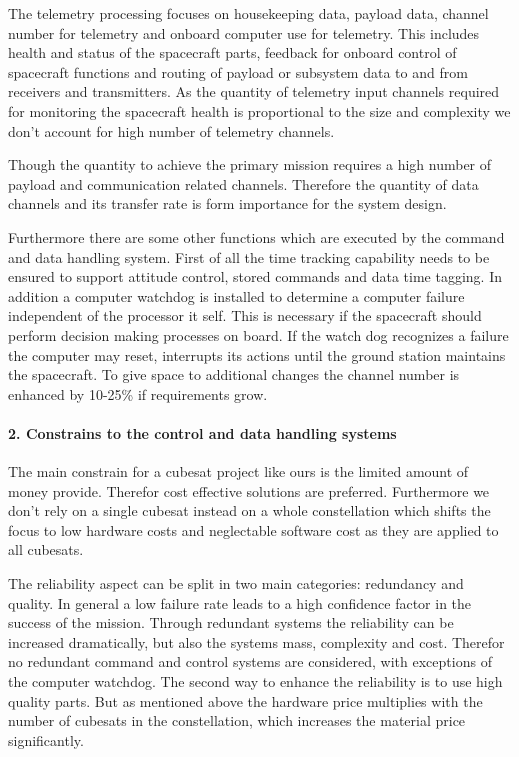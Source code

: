 The telemetry processing focuses on housekeeping data, payload data, channel number for telemetry and onboard computer use for telemetry. This includes health and status of the spacecraft parts, feedback for onboard control of spacecraft functions and routing of payload or subsystem data to and from receivers and transmitters. As the quantity of telemetry input channels required for monitoring the spacecraft health is proportional to the size and complexity we don’t account for high number of telemetry channels.

Though the quantity to achieve the primary mission requires a high number of payload and communication related channels. Therefore the quantity of data channels and its transfer rate is form importance for the system design.

Furthermore there are some other functions which are executed by the command and data handling system. First of all the time tracking capability needs to be ensured to support attitude control, stored commands and data time tagging. In addition a computer watchdog is installed to determine a computer failure independent of the processor it self. This is necessary if the spacecraft should perform decision making processes on board. If the watch dog recognizes a failure the computer may reset, interrupts its actions until the ground station maintains the spacecraft. To give space to additional changes the channel number is enhanced by 10-25\% if requirements grow.

\paragraph{2. Constrains to the control and data handling systems}

The main constrain for a cubesat project like ours is the limited amount of money provide. Therefor cost effective solutions are preferred. Furthermore we don’t rely on a single cubesat instead on a whole constellation which shifts the focus to low hardware costs and neglectable software cost as they are applied to all cubesats.

The reliability aspect can be split in two main categories: redundancy and quality. In general a low failure rate leads to a high confidence factor in the success of the mission. Through redundant systems the reliability can be increased dramatically, but also the systems mass, complexity and cost. Therefor no redundant command and control systems are considered, with exceptions of the computer watchdog. The second way to enhance the reliability is to use high quality parts. But as mentioned above the hardware price multiplies with the number of cubesats in the constellation, which increases the material price significantly.

